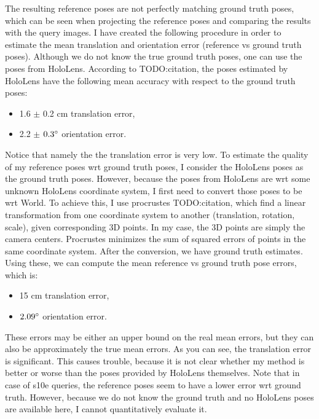 \documentclass[twoside]{ctuthesis}
\theoremstyle{plain}
\theoremstyle{definition}
\theoremstyle{note}
\begin{document}
The resulting reference poses are not perfectly matching ground truth poses, which can be seen when projecting the reference poses and comparing the results with the query images. I have created the following procedure in order to estimate the mean translation and orientation error (reference vs ground truth poses). Although we do not know the true ground truth poses, one can use the poses from HoloLens. According to TODO:citation, the poses estimated by HoloLens have the following mean accuracy with respect to the ground truth poses:

\begin{itemize}
	\item 1.6 $\pm$ 0.2 cm translation error,
	\item 2.2 $\pm$ $0.3\degree$ orientation error.
\end{itemize}

Notice that namely the the translation error is very low. To estimate the quality of my reference poses wrt ground truth poses, I consider the HoloLens poses as the ground truth poses. However, because the poses from HoloLens are wrt some unknown HoloLens coordinate system, I first need to convert those poses to be wrt World. To achieve this, I use procrustes TODO:citation, which find a linear transformation from one coordinate system to another (translation, rotation, scale), given corresponding 3D points. In my case, the 3D points are simply the camera centers. Procrustes minimizes the sum of squared errors of points in the same coordinate system. After the conversion, we have ground truth estimates. Using these, we can compute the mean reference vs ground truth pose errors, which is:

\begin{itemize}
	\item 15 cm translation error,
	\item $2.09\degree$ orientation error.
\end{itemize}

These errors may be either an upper bound on the real mean errors, but they can also be approximately the true mean errors. As you can see, the translation error is significant. This causes trouble, because it is not clear whether my method is better or worse than the poses provided by HoloLens themselves. Note that in case of s10e queries, the reference poses seem to have a lower error wrt ground truth. However, because we do not know the ground truth and no HoloLens poses are available here, I cannot quantitatively evaluate it.
\end{document}
